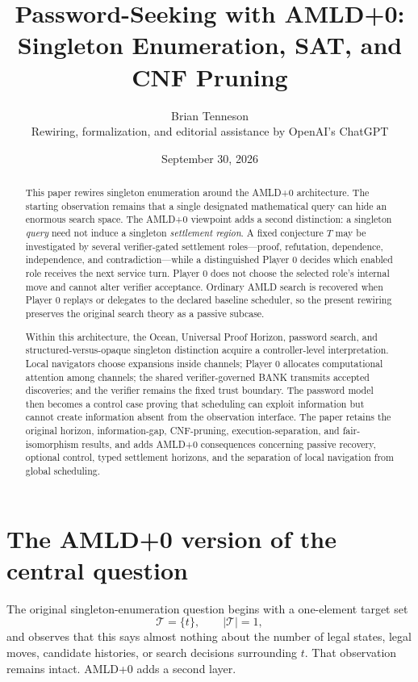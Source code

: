 \documentclass[11pt]{article}
\title{\textbf{Password-Seeking with AMLD+0:}\\
\large Singleton Enumeration, SAT, and CNF Pruning}
\author{Brian Tenneson\\[0.25em]
\small Rewiring, formalization, and editorial assistance by OpenAI's ChatGPT}
\date{September 30, 2026}
\newcommand{\Tset}{\mathcal{T}}
\begin{document}
\maketitle

\begin{abstract}
This paper rewires singleton enumeration around the AMLD+0 architecture.  The
starting observation remains that a single designated mathematical query can
hide an enormous search space.  The AMLD+0 viewpoint adds a second distinction:
a singleton \emph{query} need not induce a singleton \emph{settlement region}.
A fixed conjecture $T$ may be investigated by several verifier-gated settlement
roles---proof, refutation, dependence, independence, and contradiction---while
a distinguished Player 0 decides which enabled role receives the next service
turn.  Player 0 does not choose the selected role's internal move and cannot
alter verifier acceptance.  Ordinary AMLD search is recovered when Player 0
replays or delegates to the declared baseline scheduler, so the present
rewiring preserves the original search theory as a passive subcase.

Within this architecture, the Ocean, Universal Proof Horizon, password search,
and structured-versus-opaque singleton distinction acquire a controller-level
interpretation.  Local navigators choose expansions inside channels; Player 0
allocates computational attention among channels; the shared verifier-governed
BANK transmits accepted discoveries; and the verifier remains the fixed trust
boundary.  The password model then becomes a control case proving that
scheduling can exploit information but cannot create information absent from
the observation interface.  The paper retains the original horizon,
information-gap, CNF-pruning, execution-separation, and fair-isomorphism
results, and adds AMLD+0 consequences concerning passive recovery, optional
control, typed settlement horizons, and the separation of local navigation
from global scheduling.
\end{abstract}

\section{The AMLD+0 version of the central question}

The original singleton-enumeration question begins with a one-element target
set
\[
\Tset=\{t\},
\qquad |
\Tset|=1,
\]
and observes that this says almost nothing about the number of legal states,
legal moves, candidate histories, or search decisions surrounding $t$.
That observation remains intact.  AMLD+0 adds a second layer.
\end{document}
